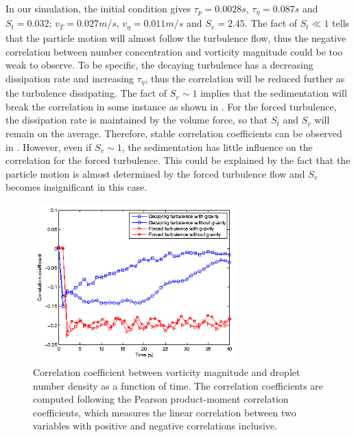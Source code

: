 In our simulation, the initial condition gives $\tau_p = 0.0028 s$, $\tau_\eta
= 0.087s$ and $S_t = 0.032$; $v_T = 0.027 m/s$, $v_{\eta} = 0.011 m/s$ and $S_v
= 2.45$. The fact of $S_t \ll 1$ tells that the particle motion will almost
follow the turbulence flow, thus the negative correlation between number
concentration and vorticity magnitude could be too weak to observe. To be
specific, the decaying turbulence has a decreasing dissipation rate and
increasing $\tau_{\eta}$, thus the correlation will be reduced further as the
turbulence dissipating. The fact of $S_v \sim 1$ implies that the sedimentation
will break the correlation in some instance as shown in .
For the forced turbulence, the dissipation rate is maintained by the volume
force, so that $S_t$ and $S_v$ will remain on the average. Therefore, stable
correlation coefficients can be observed in . However,
even if $S_v \sim 1$, the sedimentation has little influence on the correlation
for the forced turbulence. This could be explained by the fact that the
particle motion is almost determined by the forced turbulence flow and $S_v$
becomes insignificant in this case.

\begin{figure}[H]\centering
\includegraphics[width=0.7\textwidth]{Figures/correlation} \caption{Correlation
coefficient between vorticity magnitude and droplet number density as a
function of time. The correlation coefficients are computed following the
Pearson product-moment correlation coefficients, which measures the linear
correlation between two variables with positive and negative correlations
inclusive.\label{fig:correlation}} \end{figure}

